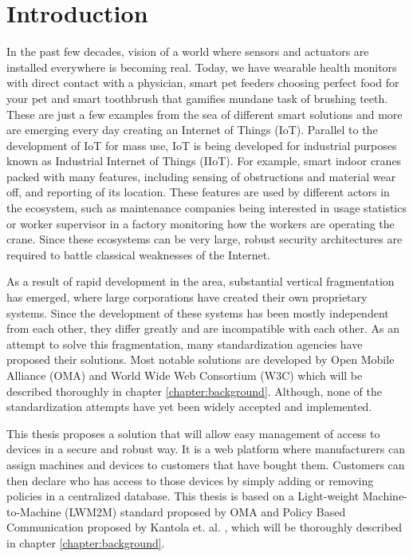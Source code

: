 \chapter{Introduction}

In the past few decades, vision of a world where sensors and actuators are installed everywhere is becoming real. Today, we have wearable health monitors with direct contact with a physician, smart pet feeders choosing perfect food for your pet and smart toothbrush that gamifies mundane task of brushing teeth. These are just a few examples from the sea of different smart solutions and more are emerging every day creating an Internet of Things (IoT). Parallel to the development of IoT for mass use, IoT is being developed for industrial purposes known as Industrial Internet of Things (IIoT). For example, smart indoor cranes packed with many features, including sensing of obstructions and material wear off, and reporting of its location. These features are used by different actors in the ecosystem, such as maintenance companies being interested in usage statistics or worker supervisor in a factory monitoring how the workers are operating the crane. Since these ecosystems can be very large, robust security architectures are required to battle classical weaknesses of the Internet.

As a result of rapid development in the area, substantial vertical fragmentation has emerged, where large corporations have created their own proprietary systems. Since the development of these systems has been mostly independent from each other, they differ greatly and are incompatible with each other. As an attempt to solve this fragmentation, many standardization agencies have proposed their solutions. Most notable solutions are developed by Open Mobile Alliance (OMA) and World Wide Web Consortium (W3C) which will be described thoroughly in chapter \ref{chapter:background}. Although, none of the standardization attempts have yet been widely accepted and implemented.

This thesis proposes a solution that will allow easy management of access to devices in a secure and robust way. It is a web platform where manufacturers can assign machines and devices to customers that have bought them. Customers can then declare who has access to those devices by simply adding or removing policies in a centralized database. This thesis is based on a Light-weight Machine-to-Machine (LWM2M) standard proposed by OMA and Policy Based Communication proposed by Kantola et. al. \cite{Kantola,5480987}, which will be thoroughly described in chapter \ref{chapter:background}.

